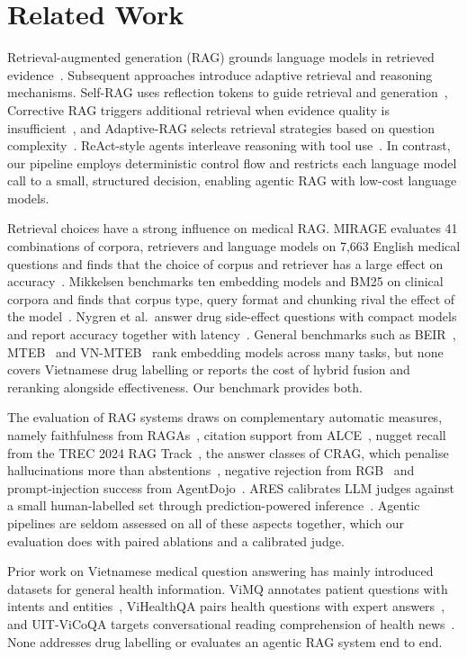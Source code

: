 \section{Related Work}\label{sec:related}

Retrieval-augmented generation (RAG) grounds language models in retrieved evidence~\cite{lewis2020rag}. Subsequent approaches introduce adaptive retrieval and reasoning mechanisms. Self-RAG uses reflection tokens to guide retrieval and generation~\cite{asai2024selfrag}, Corrective RAG triggers additional retrieval when evidence quality is insufficient~\cite{yan2024crag}, and Adaptive-RAG selects retrieval strategies based on question complexity~\cite{jeong2024adaptiverag}. ReAct-style agents interleave reasoning with tool use~\cite{yao2023react}. In contrast, our pipeline employs deterministic control flow and restricts each language model call to a small, structured decision, enabling agentic RAG with low-cost language models.

Retrieval choices have a strong influence on medical RAG. MIRAGE evaluates 41 combinations of corpora, retrievers and language models on 7{,}663 English medical questions and finds that the choice of corpus and retriever has a large effect on accuracy~\cite{xiong2024medrag}. Mikkelsen benchmarks ten embedding models and BM25 on clinical corpora and finds that corpus type, query format and chunking rival the effect of the model~\cite{mikkelsen2026clinical}. Nygren et al.\ answer drug side-effect questions with compact models and report accuracy together with latency~\cite{nygren2026drug}. General benchmarks such as BEIR~\cite{thakur2021beir}, MTEB~\cite{muennighoff2023mteb} and VN-MTEB~\cite{pham2025vnmteb} rank embedding models across many tasks, but none covers Vietnamese drug labelling or reports the cost of hybrid fusion and reranking alongside effectiveness. Our benchmark provides both.

The evaluation of RAG systems draws on complementary automatic measures, namely faithfulness from RAGAs~\cite{es2024ragas}, citation support from ALCE~\cite{gao2023alce}, nugget recall from the TREC 2024 RAG Track~\cite{pradeep2024nuggets}, the answer classes of CRAG, which penalise hallucinations more than abstentions~\cite{yang2024cragbench}, negative rejection from RGB~\cite{chen2024rgb} and prompt-injection success from AgentDojo~\cite{debenedetti2024agentdojo}. ARES calibrates LLM judges against a small human-labelled set through prediction-powered inference~\cite{saadfalcon2024ares,angelopoulos2023ppi}. Agentic pipelines are seldom assessed on all of these aspects together, which our evaluation does with paired ablations and a calibrated judge.

Prior work on Vietnamese medical question answering has mainly introduced datasets for general health information. ViMQ annotates patient questions with intents and entities~\cite{huy2021vimq}, ViHealthQA pairs health questions with expert answers~\cite{nguyen2022spbertqa}, and UIT-ViCoQA targets conversational reading comprehension of health news~\cite{luu2021vicoqa}. None addresses drug labelling or evaluates an agentic RAG system end to end.
